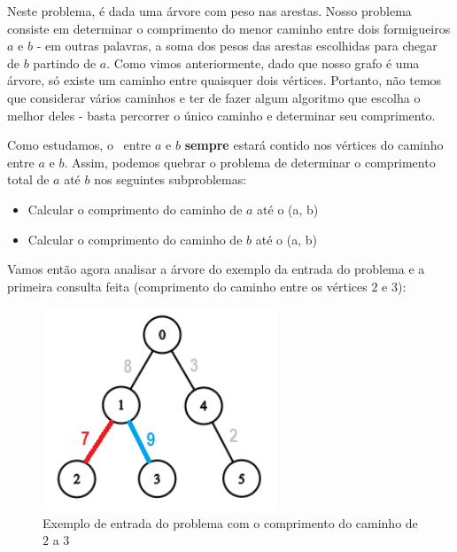 {\begin{mdframed}[backgroundcolor=blue!5]
\vspace{-0.4cm}
\end{mdframed}}

\vspace{10cm}

Neste problema, é dada uma árvore com peso nas arestas. Nosso problema consiste em determinar o comprimento do menor caminho entre dois formigueiros $a$ e $b$ - em outras palavras, a soma dos pesos das arestas escolhidas para chegar de $b$ partindo de $a$. Como vimos anteriormente, dado que nosso grafo é uma árvore, só existe um caminho entre quaisquer dois vértices. Portanto, não temos que considerar vários caminhos e ter de fazer algum algoritmo que escolha o melhor deles - basta percorrer o único caminho e determinar seu comprimento.

Como estudamos, o \LCA\ entre $a$ e $b$ \textbf{sempre} estará contido nos vértices do caminho entre $a$ e $b$. Assim, podemos quebrar o problema de determinar o comprimento total de $a$ até $b$ nos seguintes subproblemas:

\begin{itemize}
    \item Calcular o comprimento do caminho de $a$ até o \LCA(a, b)
    \item Calcular o comprimento do caminho de $b$ até o \LCA(a, b)
\end{itemize}

Vamos então agora analisar a árvore do exemplo da entrada do problema e a primeira consulta feita (comprimento do caminho entre os vértices $2$ e $3$):

\begin{figure}[htb]
\begin{center}
\includegraphics[width=7cm]{images/ants10-graph.png}
\end{center}
\caption{\label{fig:arvore-euler2}Exemplo de entrada do problema com o comprimento do caminho de  $2$ a $3$}
\end{figure}

